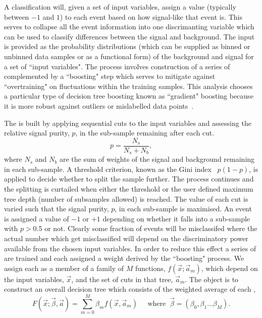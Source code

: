 A classification \BDT will, given a set of input variables, assign a value (typically between $-1$ and $1$) to each event based on how signal-like that event is. This serves to collapse all the event information into one discrimanting variable which can be used to classify differences between the signal and background. The input is provided as the probability distributions (which can be supplied as binned or unbinned data samples or as a functional form) of the background and signal for a set of ``input variables". The process involves construction of a series of \DTs complemented by a ``boosting" step which serves to mitigate against ``overtraining" on fluctuations within the training samples. This analysis chooses a particular type of decision tree boosting known as ``gradient" boosting because it is more robust against outliers or mislabelled data points~\cite{TMVA}.

The \DT is built by applying sequential cuts to the input variables and assessing the relative signal purity, $p$, in the sub-sample remaining after each cut.
\begin{equation}
  p = \frac{N_{s}}{N_{s}+N_{b}},
\end{equation}
where $N_{s}$ and $N_{b}$ are the sum of weights of the signal and background remaining in each sub-sample. A threshold criterion, known as the Gini index~\cite{TMVA} $p(1-p)$, is applied to decide whether to split the sample further. The process continues and the splitting is curtailed when either the threshold or the user defined maximum tree depth (number of subsamples allowed) is reached. The value of each cut is varied such that the signal purity, $p$, in each sub-sample is maximised. An event is assigned a value of $-1$ or $+1$ depending on whether it falls into a sub-sample with $p>$0.5 or not. Clearly some fraction of events will be misclassifed where the actual number which get misclassified will depend on the discriminatory power available from the chosen input variables. In order to reduce this effect a series of \DTs are trained and each assigned a weight derived by the ``boosting" process. 
We assign each \DT as a member of a family of $M$ functions, $f(\vec{x};\vec{a}_{m})$, which depend on the input variables, $\vec{x}$, and the set of cuts in that tree, $\vec{a}_{m}$. The object is to construct an overall decision tree which consists of the weighted average of each \DT,
\begin{equation}
  F(\vec{x};\vec{\beta},\vec{a}) = \sum_{m=0}^{M} \beta_{m}f(\vec{x},\vec{a}_{m}) \;\;\;\;\; \textrm{where} \;\; \vec{\beta} = (\beta_{0},\beta_{1}...\beta_{M}).
\end{equation}

